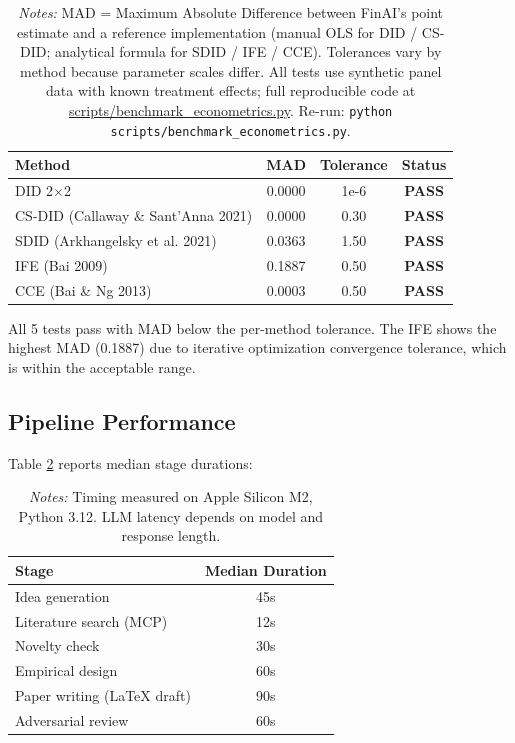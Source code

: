 \documentclass[12pt, a4paper]{article}
\begin{document}
\begin{table}[htbp]
\centering
\caption{Econometric Implementation Accuracy Benchmarks}
\label{tab:benchmarks}
\begin{tabular}{lccc}
\toprule
Method & MAD & Tolerance & Status \\
\midrule
DID 2$\times$2 & 0.0000 & 1e-6 & \textbf{PASS} \\
CS-DID (Callaway \& Sant'Anna 2021) & 0.0000 & 0.30 & \textbf{PASS} \\
SDID (Arkhangelsky et al. 2021) & 0.0363 & 1.50 & \textbf{PASS} \\
IFE (Bai 2009) & 0.1887 & 0.50 & \textbf{PASS} \\
CCE (Bai \& Ng 2013) & 0.0003 & 0.50 & \textbf{PASS} \\
\bottomrule
\end{tabular}
\caption*{\textit{Notes:} MAD = Maximum Absolute Difference between FinAI's point estimate and a reference implementation (manual OLS for DID / CS-DID; analytical formula for SDID / IFE / CCE). Tolerances vary by method because parameter scales differ. All tests use synthetic panel data with known treatment effects; full reproducible code at \url{scripts/benchmark\_econometrics.py}. Re-run: \texttt{python scripts/benchmark\_econometrics.py}.}
\end{table}

All 5 tests pass with MAD below the per-method tolerance. The IFE shows the highest MAD (0.1887) due to iterative optimization convergence tolerance, which is within the acceptable range.

\subsection{Pipeline Performance}

Table \ref{tab:timing} reports median stage durations:

\begin{table}[htbp]
\centering
\caption{Pipeline Stage Timing (Median, Cold Start)}
\label{tab:timing}
\begin{tabular}{lc}
\toprule
Stage & Median Duration \\
\midrule
Idea generation & 45s \\
Literature search (MCP) & 12s \\
Novelty check & 30s \\
Empirical design & 60s \\
Paper writing (LaTeX draft) & 90s \\
Adversarial review & 60s \\
\bottomrule
\end{tabular}
\caption*{\textit{Notes:} Timing measured on Apple Silicon M2, Python 3.12. LLM latency depends on model and response length.}
\end{table}
\end{document}
